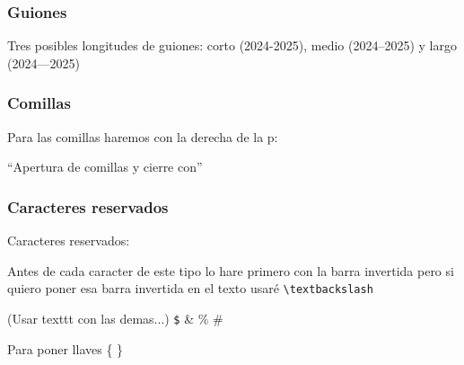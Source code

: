 \documentclass[12pt]{article}
\begin{document}
\subsubsection{Guiones}

Tres posibles longitudes de guiones: corto (2024-2025), medio (2024--2025) y largo (2024---2025)

\subsubsection{Comillas}

Para las comillas haremos con la derecha de la p:

``Apertura de comillas y cierre con''


\subsubsection{Caracteres reservados}

Caracteres reservados:

Antes de cada caracter de este tipo lo hare primero con la barra invertida pero si quiero poner esa barra invertida en el texto usaré \verb|\textbackslash|

(Usar texttt con las demas...)
\texttt{\$}
\&
\%
\#

Para poner llaves \{ \}
\end{document}
